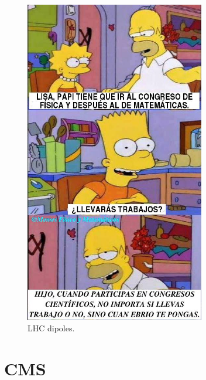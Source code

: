 \begin{figure}[!h]
  \centering
  \includegraphics[width=0.7\textwidth]{../images/ch2/2}
  \caption[LHC dipoles]{LHC dipoles.}\label{fig:cms_layout}
\end{figure}


\section{CMS}

